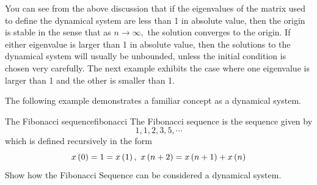 You can see from the above discussion that if the eigenvalues of the matrix
used to define the dynamical system are less than 1 in absolute value, then
the origin is stable in the sense that as $n\rightarrow \infty ,$ the
solution converges to the origin. If either eigenvalue is larger than 1 in
absolute value, then the solutions to the dynamical system will usually be
unbounded, unless the initial condition is chosen very carefully. The next
example exhibits the case where one eigenvalue is larger than 1 and the
other is smaller than 1.

The following example demonstrates a familiar concept as a dynamical system.

\begin{example}{The Fibonacci sequence}{fibonacci}
The Fibonacci sequence is the sequence given by 
\begin{equation*}
1, 1, 2, 3, 5, \cdots
\end{equation*}
which is defined recursively in the
form
\begin{equation*}
x\left(0\right) =1=x\left(1\right) ,\ x\left(n+2\right) =x\left(
n+1\right) +x\left(n\right)
\end{equation*}
Show how the Fibonacci Sequence can be considered a dynamical system.
\end{example}

